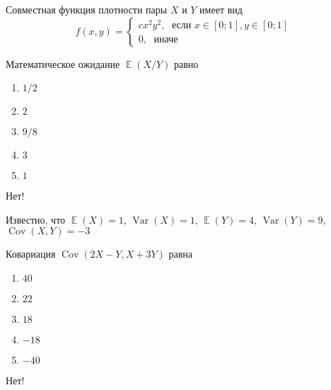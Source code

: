 \documentclass[t]{beamer}
\DeclareMathOperator{\Var}{Var}
\DeclareMathOperator{\Cov}{Cov}
\DeclareMathOperator{\E}{\mathbb{E}}
\begin{document}
 \begin{frame} \label{23-No} 
\begin{block}{23} 

Совместная функция плотности пары $X$ и $Y$ имеет вид
\[
f(x,y)=\begin{cases}
cx^2y^2, \; \text{ если } x\in[0;1], y\in [0;1] \\
0, \; \text{ иначе}
\end{cases}
\]

\vspace{0.5cm} 
 
 
Математическое ожидание $\E(X/Y)$ равно
 


 \end{block} 
\begin{enumerate} 
\item[] \hyperlink{23-No}{\beamergotobutton{} $1/2$}
\item[] \hyperlink{23-No}{\beamergotobutton{} $2$
}
\item[] \hyperlink{23-Yes}{\beamergotobutton{} $9/8$}
\item[] \hyperlink{23-No}{\beamergotobutton{} $3$}
\item[] \hyperlink{23-No}{\beamergotobutton{} $1$}
\end{enumerate} 

 \alert{Нет!} 
\end{frame} 


 \begin{frame} \label{24-No} 
\begin{block}{24} 

Известно, что $\E(X)=1$, $\Var(X)=1$, $\E(Y)=4$, $\Var(Y)=9$, $\Cov(X,Y)=-3$

\vspace{0.5cm} 
 
 
Ковариация $\Cov(2X-Y,X+3Y)$ равна
 


 \end{block} 
\begin{enumerate} 
\item[] \hyperlink{24-No}{\beamergotobutton{} $40$}
\item[] \hyperlink{24-No}{\beamergotobutton{} $22$}
\item[] \hyperlink{24-No}{\beamergotobutton{} $18$
}
\item[] \hyperlink{24-No}{\beamergotobutton{} $-18$}
\item[] \hyperlink{24-Yes}{\beamergotobutton{} $-40$}
\end{enumerate} 

 \alert{Нет!} 
\end{frame} 
\end{document}
